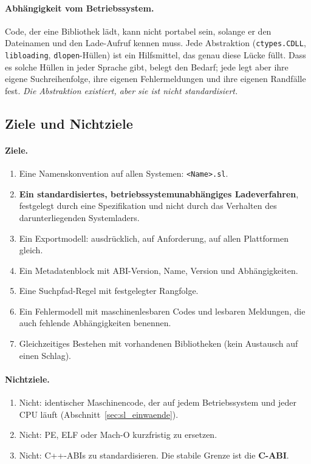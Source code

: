 \paragraph{Abhängigkeit vom Betriebssystem.} Code, der eine Bibliothek lädt, kann nicht portabel sein, solange er den Dateinamen und den Lade-Aufruf kennen muss. Jede Abstraktion (\texttt{ctypes.CDLL}, \texttt{libloading}, \texttt{dlopen}-Hüllen) ist ein Hilfsmittel, das genau diese Lücke füllt. Dass es solche Hüllen in jeder Sprache gibt, belegt den Bedarf; jede legt aber ihre eigene Suchreihenfolge, ihre eigenen Fehlermeldungen und ihre eigenen Randfälle fest. \emph{Die Abstraktion existiert, aber sie ist nicht standardisiert.}

\subsection{Ziele und Nichtziele}

\paragraph{Ziele.}

\begin{enumerate}
	\item Eine Namenskonvention auf allen Systemen: \texttt{<Name>.sl}.
	\item \textbf{Ein standardisiertes, betriebssystemunabhängiges Ladeverfahren}, festgelegt durch eine Spezifikation und nicht durch das Verhalten des darunterliegenden Systemladers.
	\item Ein Exportmodell: ausdrücklich, auf Anforderung, auf allen Plattformen gleich.
	\item Ein Metadatenblock mit ABI-Version, Name, Version und Abhängigkeiten.
	\item Eine Suchpfad-Regel mit festgelegter Rangfolge.
	\item Ein Fehlermodell mit maschinenlesbaren Codes und lesbaren Meldungen, die auch fehlende Abhängigkeiten benennen.
	\item Gleichzeitiges Bestehen mit vorhandenen Bibliotheken (kein Austausch auf einen Schlag).
\end{enumerate}

\paragraph{Nichtziele.}

\begin{enumerate}
	\item Nicht: identischer Maschinencode, der auf jedem Betriebssystem und jeder CPU läuft (Abschnitt~\ref{sec:sl_einwaende}).
	\item Nicht: PE, ELF oder Mach-O kurzfristig zu ersetzen.
	\item Nicht: C++-ABIs zu standardisieren. Die stabile Grenze ist die \textbf{C-ABI}.
\end{enumerate}

